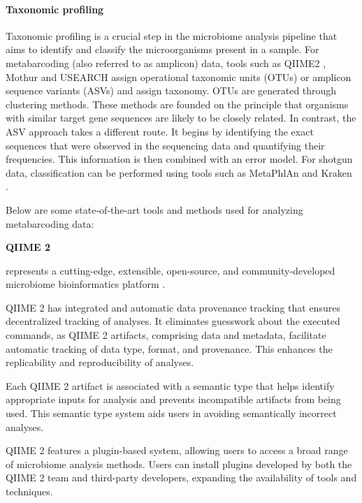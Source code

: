         \paragraph*{Taxonomic profiling}
        Taxonomic profiling is a crucial step in the microbiome analysis pipeline that aims to identify and classify the microorganisms present in a sample. For metabarcoding (also referred to as amplicon) data, tools such as QIIME2 \cite{bolyen2019qiime2}, Mothur \cite{schloss_introducting_2009} and USEARCH \cite{edgar2010search} assign operational taxonomic units (OTUs) or amplicon sequence variants (ASVs) and assign taxonomy. OTUs are generated through clustering methods. These methods are founded on the principle that organisms with similar target gene sequences are likely to be closely related. In contrast, the ASV approach takes a different route. It begins by identifying the exact sequences that were observed in the sequencing data and quantifying their frequencies. This information is then combined with an error model.
        For shotgun data, classification can be performed using tools such as MetaPhlAn \cite{blanco2023extending} and Kraken \cite{wood2019improved}.


        Below are some state-of-the-art tools and methods used for analyzing metabarcoding data:
        
            \textbf{QIIME 2}
            
                 represents a cutting-edge, extensible, open-source, and community-developed microbiome bioinformatics platform \cite{bolyen2019qiime2}. 

                QIIME 2 has integrated and automatic data provenance tracking that ensures decentralized tracking of analyses. It eliminates guesswork about the executed commands, as QIIME 2 artifacts, comprising data and metadata, facilitate automatic tracking of data type, format, and provenance. This enhances the replicability and reproducibility of analyses.
                
                Each QIIME 2 artifact is associated with a semantic type that helps identify appropriate inputs for analysis and prevents incompatible artifacts from being used. This semantic type system aids users in avoiding semantically incorrect analyses.
                
                QIIME 2 features a plugin-based system, allowing users to access a broad range of microbiome analysis methods. Users can install plugins developed by both the QIIME 2 team and third-party developers, expanding the availability of tools and techniques.
                
